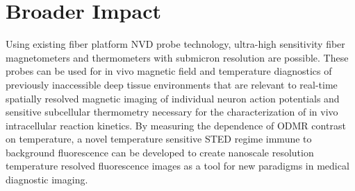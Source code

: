 \documentclass[11pt]{article}
\begin{document}
\section{Broader Impact}
Using existing fiber platform NVD probe technology, ultra-high sensitivity fiber magnetometers and thermometers with submicron resolution are possible.  These probes can be used for in vivo magnetic field and temperature diagnostics of previously inaccessible deep tissue environments that are relevant to real-time spatially resolved magnetic imaging of individual neuron action potentials and sensitive subcellular thermometry necessary for the characterization of in vivo intracellular reaction kinetics.  By measuring the dependence of ODMR contrast on temperature, a novel temperature sensitive STED regime immune to background fluorescence can be developed to create nanoscale resolution temperature resolved fluorescence images as a tool for new paradigms in medical diagnostic imaging.
\end{document}
